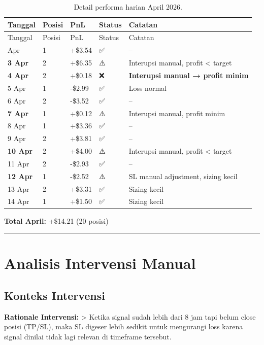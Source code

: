 \documentclass[
  11pt,
  a4paper,
]{article}
\begin{document}
\begin{longtable}[]{@{}lllll@{}}
\caption{Detail performa harian April
2026.}\label{tbl-april}\tabularnewline
\toprule\noalign{}
Tanggal & Posisi & PnL & Status & Catatan \\
\midrule\noalign{}
\endfirsthead
\toprule\noalign{}
Tanggal & Posisi & PnL & Status & Catatan \\
\midrule\noalign{}
\endhead
\bottomrule\noalign{}
\endlastfoot
2 Apr & 1 & +\$3.54 & ✅ & -- \\
\textbf{3 Apr} & 2 & +\$6.35 & ⚠️ & Interupsi manual, profit \textless{}
target \\
\textbf{4 Apr} & 2 & +\$0.18 & ❌ & \textbf{Interupsi manual → profit
minim} \\
5 Apr & 1 & -\$2.99 & ✅ & Loss normal \\
6 Apr & 2 & -\$3.52 & ✅ & -- \\
\textbf{7 Apr} & 1 & +\$0.12 & ⚠️ & Interupsi manual, profit minim \\
8 Apr & 1 & +\$3.36 & ✅ & -- \\
9 Apr & 2 & +\$3.81 & ✅ & -- \\
\textbf{10 Apr} & 2 & +\$4.00 & ⚠️ & Interupsi manual, profit
\textless{} target \\
11 Apr & 2 & -\$2.93 & ✅ & -- \\
\textbf{12 Apr} & 1 & -\$2.52 & ⚠️ & SL manual adjustment, sizing
kecil \\
13 Apr & 2 & +\$3.31 & ✅ & Sizing kecil \\
14 Apr & 1 & +\$1.50 & ✅ & Sizing kecil \\
\end{longtable}

\textbf{Total April:} +\$14.21 (20 posisi)

\begin{center}\rule{0.5\linewidth}{0.5pt}\end{center}

\section{Analisis Intervensi Manual}\label{analisis-intervensi-manual}

\subsection{Konteks Intervensi}\label{konteks-intervensi}

\textbf{Rationale Intervensi:} \textgreater{} Ketika signal sudah lebih
dari 8 jam tapi belum close posisi (TP/SL), maka SL digeser lebih
sedikit untuk mengurangi loss karena signal dinilai tidak lagi relevan
di timeframe tersebut.
\end{document}
